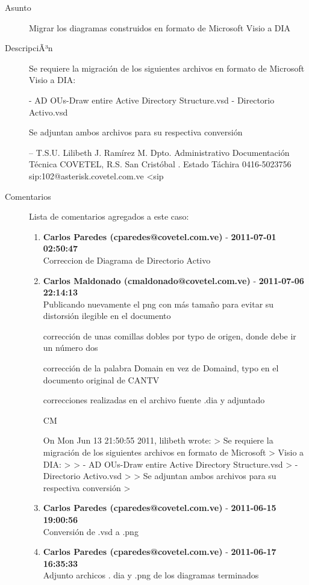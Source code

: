 \begin{description}

\item[Asunto] Migrar los diagramas construidos en formato de Microsoft Visio a DIA\item[DescripciÃ³n] Se requiere la migración de los siguientes archivos en formato de Microsoft
Visio a DIA:

   - AD OUs-Draw entire Active Directory Structure.vsd
   - Directorio Activo.vsd

Se adjuntan ambos archivos para su respectiva conversión

-- 
T.S.U. Lilibeth J. Ramírez M.
Dpto. Administrativo
Documentación Técnica
COVETEL, R.S.
San Cristóbal . Estado Táchira
0416-5023756
sip:102@asterisk.covetel.com.ve <sip%

\item[Comentarios] Lista de comentarios agregados a este caso:  
\begin{enumerate}
        \item {\bfseries Carlos Paredes (cparedes@covetel.com.ve)  } - {\bfseries 2011-07-01 02:50:47} \\ Correccion de Diagrama de Directorio Activo        \item {\bfseries Carlos Maldonado (cmaldonado@covetel.com.ve)  } - {\bfseries 2011-07-06 22:14:13} \\ Publicando nuevamente el png con más tamaño para evitar su distorsión ilegible
en el documento

corrección de unas comillas dobles por typo de origen, donde debe ir un número
dos

corrección de la palabra Domain en vez de Domaind, typo en el documento
original de CANTV

correcciones realizadas en el archivo fuente .dia y adjuntado

CM

On Mon Jun 13 21:50:55 2011, lilibeth wrote:
> Se requiere la migración de los siguientes archivos en formato de Microsoft
> Visio a DIA:
>
> - AD OUs-Draw entire Active Directory Structure.vsd
> - Directorio Activo.vsd
>
> Se adjuntan ambos archivos para su respectiva conversión
>        \item {\bfseries Carlos Paredes (cparedes@covetel.com.ve)  } - {\bfseries 2011-06-15 19:00:56} \\ Conversión de .vsd a .png        \item {\bfseries Carlos Paredes (cparedes@covetel.com.ve)  } - {\bfseries 2011-06-17 16:35:33} \\ Adjunto archicos . dia y .png de los diagramas terminados    \end{enumerate}

\end{description}
